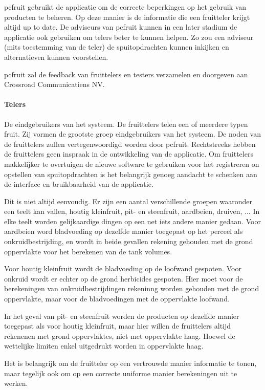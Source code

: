 pcfruit gebruikt de applicatie om de correcte beperkingen op het gebruik van
producten te beheren. Op deze manier is de informatie die een fruitteler krijgt altijd up to
date. De adviseurs van pcfruit kunnen in een later stadium de applicatie ook gebruiken om
telers beter te kunnen helpen. Zo zou een adviseur (mits toestemming van de teler) de
spuitopdrachten kunnen inkijken en alternatieven kunnen voorstellen.

pcfruit zal de feedback van fruittelers en testers verzamelen en doorgeven aan Crossroad
Communicatiens NV.

\paragraph {Telers} De eindgebruikers van het systeem. De fruittelers telen een of meerdere
typen fruit. Zij vormen de grootste groep eindgebruikers van het systeem. De noden van de
fruittelers zullen vertegenwoordigd worden door pcfruit. Rechtstreeks hebben de
fruittelers geen inspraak in de ontwikkeling van de applicatie. Om fruittelers makkelijker te
overtuigen de nieuwe software te gebruiken voor het registreren on opstellen van
spuitopdrachten is het belangrijk genoeg aandacht te schenken aan de interface en
bruikbaarheid van de applicatie.

Dit is niet altijd eenvoudig. Er zijn een aantal verschillende groepen waaronder een teelt
kan vallen, houtig kleinfruit, pit- en steenfruit, aardbeien, druiven, ... In elke teelt
worden gelijkaardige dingen op een net iets andere manier gedaan. Voor aardbeien word
bladvoeding op dezelfde manier toegepast op het perceel als onkruidbestrijding, en wordt
in beide gevallen rekening gehouden met de grond oppervlakte voor het berekenen van de
tank volumes.

Voor houtig kleinfruit wordt de bladvoeding op de loofwand gespoten. Voor
onkruid wordt er echter op de grond herbicides gespoten. Hier moet voor de berekeningen
van onkruidbestrijdingen rekeninng worden gehouden met de grond oppervlakte, maar voor de
bladvoedingen met de oppervlakte loofwand.

In het geval van pit- en steenfruit worden de producten op dezelfde manier toegepast als
voor houtig kleinfruit, maar hier willen de fruittelers altijd rekenenen met grond
oppervlaktes, niet met oppervlakte haag. Hoewel de wettelijke limiten enkel uitgedrukt
worden in oppervlakte haag.

Het is belangrijk om de fruitteler op een vertrouwde manier informatie te tonen, maar tegelijk
ook om op een correcte uniforme manier berekeningen uit te werken.

